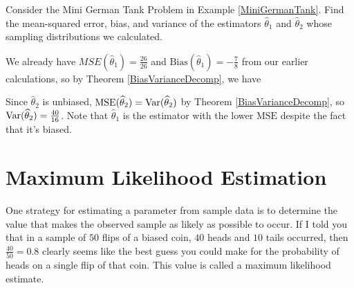 \begin{examp} Consider the Mini German Tank Problem in Example \ref{MiniGermanTank}. Find the mean-squared error, bias, and variance of the estimators $\widehat{\theta}_1$ and $\widehat{\theta}_2$ whose sampling distributions we calculated.
\par
\noindent We already have $MSE(\widehat{\theta}_1) =\frac{26}{26}$ and $\text{Bias}(\widehat{\theta}_1) =-\frac{7}{8}$ from our earlier calculations, so by Theorem \ref{BiasVarianceDecomp}, we have
\par
\noindent Since $\widehat{\theta}_2$ is unbiased, $\text{MSE}(\widehat{\theta}_2) = \operatorname{Var}(\widehat{\theta}_2)$ by Theorem \ref{BiasVarianceDecomp}, so $\operatorname{Var}(\widehat{\theta}_2) = \frac{40}{16}$. Note that $\widehat{\theta}_1$ is the estimator with the lower $\text{MSE}$ despite the fact that it's biased.
\end{examp}

\section{Maximum Likelihood Estimation}

One strategy for estimating a parameter from sample data is to determine the value that makes the observed sample as likely as possible to occur. If I told you that in a sample of $50$ flips of a biased coin, $40$ heads and $10$ tails occurred, then $\frac{40}{50} = 0.8$ clearly seems like the best guess you could make for the probability of heads on a single flip of that coin. This value is called a maximum likelihood estimate.

